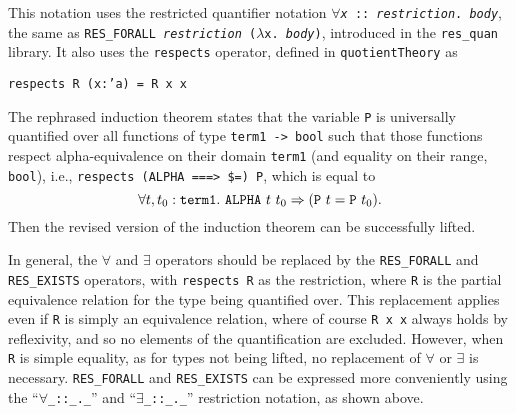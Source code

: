 \documentclass[envcountsame,runningheads]{llncs}
\newcommand{\quotient}{partial equivalence}
\begin{document}
This notation uses the restricted quantifier notation
{\tt $\forall${\it x} :: {\it restriction}. {\it body}},
the same as
{\tt RES\_FORALL {\it restriction} ($\lambda$x. {\it body})},
introduced in
the {\tt res\_quan} library. It also uses the {\tt respects} operator,
defined in {\tt quotientTheory} as
\begin{center}
{\tt respects R (x:'a) = R x x}
\end{center}
The rephrased induction theorem
states that the variable {\tt P}
is universally quantified over all functions of type {\tt term1 -> bool}
such that those functions respect alpha-equivalence on their domain
{\tt term1}
(and equality on their range,
{\tt bool}),
i.e., {\tt respects (ALPHA ===> \$=) P}, which is equal to
$$\forall t,t_0 : {\tt term1}.\ 
{\tt ALPHA}\ t\ t_0 \Rightarrow ({\tt P}\ t = {\tt P}\ t_0).$$
Then the revised version of the induction theorem can be successfully
lifted.

In general, the {\tt $\forall$} and {\tt $\exists$}
operators should be replaced by the
{\tt RES\_FORALL} and
{\tt RES\_EXISTS} operators,
with {\tt respects R} as the restriction, where {\tt R} is the
\quotient{} relation for the type being quantified over.
This replacement applies even if {\tt R} is simply an equivalence relation,
where of course {\tt R x x} always holds by reflexivity, and so
no elements of the quantification are excluded.
However, when {\tt R} is simple equality, as for types not being lifted,
no replacement of {\tt $\forall$} or {\tt $\exists$}
is necessary.
{\tt RES\_FORALL} and {\tt RES\_EXISTS} can be
expressed more conveniently using the
``{\tt $\forall$\_::\_.\_}'' and
``{\tt $\exists$\_::\_.\_}''
restriction notation, as shown above.
\end{document}
